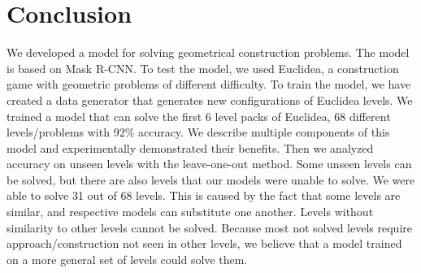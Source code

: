 \chapter{Conclusion}
We developed a model for solving geometrical construction problems. The model is based on Mask R-CNN. To test the model, we used Euclidea, a construction game with geometric problems of different difficulty. To train the model, we have created a data generator that generates new configurations of Euclidea levels. We trained a model that can solve the first 6 level packs of Euclidea, 68 different levels/problems with 92\% accuracy. We describe multiple components of this model and experimentally demonstrated their benefits. Then we analyzed accuracy on unseen levels with the leave-one-out method. Some unseen levels can be solved, but there are also levels that our models were unable to solve. We were able to solve 31 out of 68 levels. This is caused by the fact that some levels are similar, and respective models can substitute one another. Levels without similarity to other levels cannot be solved. Because most not solved levels require approach/construction not seen in other levels, we believe that a model trained on a more general set of levels could solve them.

